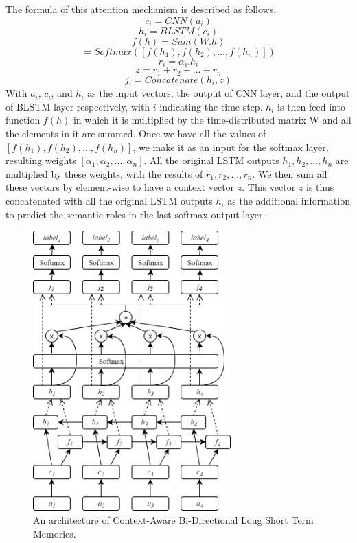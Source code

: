 The formula of this attention mechanism is described as follows.
\begin{equation}
c_{i} = CNN(a_{i})
\end{equation}
\begin{equation}
h_{i} = BLSTM(c_{i})
\end{equation}
\begin{equation}
f(h) = Sum(W.h)
\end{equation}
\begin{equation}
[\alpha_{1}, \alpha_{2}, ..., \alpha_{n}] = Softmax([f(h_{1}), f(h_{2}), ..., f(h_{n})])
\end{equation}
\begin{equation}
r_{i} = \alpha_{i}.h_{i}
\end{equation}
\begin{equation}
z = r_{1} + r_{2} + ... + r_{n}
\end{equation}
\begin{equation}
j_{i} = Concatenate(h_{i}, z)
\end{equation}
With $a_{i}$, $c_{i}$, and $h_{i}$ as the input vectors, the output of CNN layer, and the output of BLSTM layer respectively, with $i$ indicating the time step. $h_{i}$ is then feed into function $f(h)$ in which it is multiplied by the time-distributed matrix W and all the elements in it are summed. Once we have all the values of $[f(h_{1}), f(h_{2}), ..., f(h_{n})]$, we make it as an input for the softmax layer, resulting weights $[\alpha_{1}, \alpha_{2}, ..., \alpha_{n}]$. All the original LSTM outputs $h_{1}, h_{2}, ..., h_{n}$ are multiplied by these weights, with the results of $r_{1}, r_{2}, ..., r_{n}$. We then sum all these vectors by element-wise to have a context vector $z$. This vector $z$ is thus concatenated with all the original LSTM outputs $h_{i}$ as the additional information to predict the semantic roles in the last softmax output layer.

\begin{figure}
	\includegraphics[width=3in]{cabilstm}
	\caption{An architecture of Context-Aware Bi-Directional Long Short Term Memories.}
	\label{fig:cabilstm}
\end{figure}

